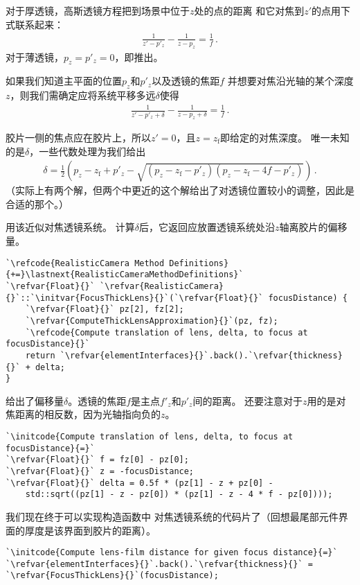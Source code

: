 对于厚透镜，高斯透镜方程把到场景中位于$z$处的点的距离
和它对焦到$z'$的点用下式联系起来：
\begin{align}\label{eq:6.3}
    \frac{1}{z'-p'_z}-\frac{1}{z-p_z}=\frac{1}{f}\, .
\end{align}
对于薄透镜，$p_z=p'_z=0$，即推出。

如果我们知道主平面的位置$p_z$和$p'_z$以及透镜的焦距$f$
并想要对焦沿光轴的某个深度$z$，则我们需确定应将系统平移多远$\delta$使得
\begin{align*}
    \frac{1}{z'-p'_z+\delta}-\frac{1}{z-p_z+\delta}=\frac{1}{f}\, .
\end{align*}

胶片一侧的焦点应在胶片上，所以$z'=0$，且$z=z_{\mathrm{f}}$即给定的对焦深度。
唯一未知的是$\delta$，一些代数处理为我们给出
\begin{align}\label{eq:6.4}
    \delta=\frac{1}{2}\left(p_z-z_{\mathrm{f}}+p'_z-\sqrt{(p_z-z_{\mathrm{f}}-p'_z)(p_z-z_{\mathrm{f}}-4f-p'_z)}\right)\, .
\end{align}
（实际上有两个解，但两个中更近的这个解给出了对透镜位置较小的调整，因此是合适的那个。）

用该近似对焦透镜系统。
计算$\delta$后，它返回应放置透镜系统处沿$z$轴离胶片的偏移量。
\begin{lstlisting}
`\refcode{RealisticCamera Method Definitions}{+=}\lastnext{RealisticCameraMethodDefinitions}`
`\refvar{Float}{}` `\refvar{RealisticCamera}{}`::`\initvar{FocusThickLens}{}`(`\refvar{Float}{}` focusDistance) {
    `\refvar{Float}{}` pz[2], fz[2];
    `\refvar{ComputeThickLensApproximation}{}`(pz, fz);
    `\refcode{Compute translation of lens, delta, to focus at focusDistance}{}`
    return `\refvar{elementInterfaces}{}`.back().`\refvar{thickness}{}` + delta;
}
\end{lstlisting}

给出了偏移量$\delta$。透镜的焦距$f$是主点$f'_z$和$p'_z$间的距离。
还要注意对于$z$用的是对焦距离的相反数，因为光轴指向负的$z$。
\begin{lstlisting}
`\initcode{Compute translation of lens, delta, to focus at focusDistance}{=}`
`\refvar{Float}{}` f = fz[0] - pz[0];
`\refvar{Float}{}` z = -focusDistance;
`\refvar{Float}{}` delta = 0.5f * (pz[1] - z + pz[0] -
    std::sqrt((pz[1] - z - pz[0]) * (pz[1] - z - 4 * f - pz[0])));
\end{lstlisting}

我们现在终于可以实现构造函数中
对焦透镜系统的代码片了（回想最尾部元件界面的厚度是该界面到胶片的距离）。
\begin{lstlisting}
`\initcode{Compute lens-film distance for given focus distance}{=}`
`\refvar{elementInterfaces}{}`.back().`\refvar{thickness}{}` = `\refvar{FocusThickLens}{}`(focusDistance);
\end{lstlisting}


